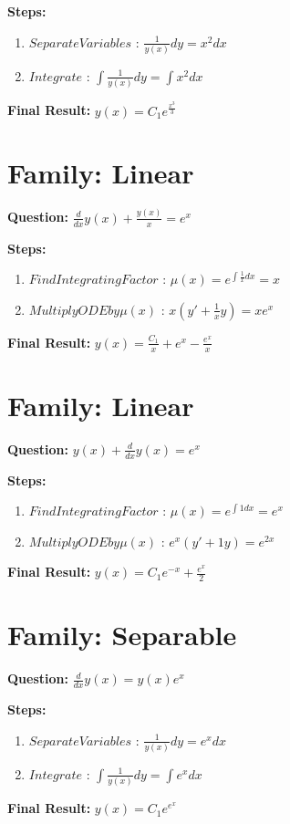 \documentclass{article}
\begin{document}
\textbf{Steps:}
\begin{enumerate}
\item $Separate Variables$ :  $\frac{1}{y{\left(x \right)}} dy = x^{2} dx$
\item $Integrate$ :  $\int \frac{1}{y{\left(x \right)}} dy = \int x^{2} dx$
\end{enumerate}
\textbf{Final Result:} $y{\left(x \right)} = C_{1} e^{\frac{x^{3}}{3}}$

\section*{Family: Linear}
\textbf{Question:} $\frac{d}{d x} y{\left(x \right)} + \frac{y{\left(x \right)}}{x} = e^{x}$

\textbf{Steps:}
\begin{enumerate}
\item $Find Integrating Factor$ :  $\mu(x) = e^{\int \frac{1}{x} dx} = x$
\item $Multiply ODE by \mu(x)$ :  $x(y' + \frac{1}{x}y) = x e^{x}$
\end{enumerate}
\textbf{Final Result:} $y{\left(x \right)} = \frac{C_{1}}{x} + e^{x} - \frac{e^{x}}{x}$

\section*{Family: Linear}
\textbf{Question:} $y{\left(x \right)} + \frac{d}{d x} y{\left(x \right)} = e^{x}$

\textbf{Steps:}
\begin{enumerate}
\item $Find Integrating Factor$ :  $\mu(x) = e^{\int 1 dx} = e^{x}$
\item $Multiply ODE by \mu(x)$ :  $e^{x}(y' + 1y) = e^{2 x}$
\end{enumerate}
\textbf{Final Result:} $y{\left(x \right)} = C_{1} e^{- x} + \frac{e^{x}}{2}$

\section*{Family: Separable}
\textbf{Question:} $\frac{d}{d x} y{\left(x \right)} = y{\left(x \right)} e^{x}$

\textbf{Steps:}
\begin{enumerate}
\item $Separate Variables$ :  $\frac{1}{y{\left(x \right)}} dy = e^{x} dx$
\item $Integrate$ :  $\int \frac{1}{y{\left(x \right)}} dy = \int e^{x} dx$
\end{enumerate}
\textbf{Final Result:} $y{\left(x \right)} = C_{1} e^{e^{x}}$
\end{document}
